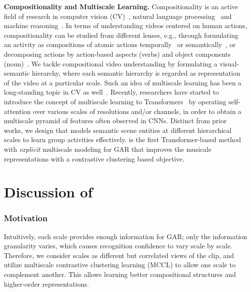 \documentclass[runningheads]{llncs}
\begin{document}
 
\noindent \textbf{Compositionality
and Multiscale Learning.}
Compositionality is an active field of research 
in computer vision (CV)~\cite{zhan2020multi,kim2020safcar,yan2020interactive,sun2021counterfactual}, 
natural language processing~\cite{socher2014grounded,vendrov2015order,irsoy2014deep,dankers2021paradox}
and machine reasoning~\cite{hudson2018compositional,hudson2019learning,bottou2014machine}.
In terms of understanding videos centered on human actions, compositionality can be studied from different lenses, e.g., through formulating an activity 
as compositions of atomic actions temporally~\cite{rai2021home,grunde2021agqa,chen2020rit,luo2021moma} or semantically~\cite{shao2020finegym,suris2021learning}, or decomposing actions by action-based aspects (verbs) and object components (noun)~\cite{ji2020action,jia2020lemma,materzynska2020something,le2021c,luo2021moma}.
We tackle compositional video understanding by formulating a visual-semantic hierarchy, where each 
semantic
hierarchy is regarded as representation of the video at 
a particular scale. Such an idea of multiscale learning has been a long-standing topic
in CV 
as well~\cite{li2020dynamic,li2016visual,gong2019cnn,haber2018learning}.
Recently, researchers 
have 
started to introduce the concept of multiscale learning to Transformers~\cite{fan2021multiscale,liu2021swin,han2021transformer} by operating self-attention over various scales of resolutions and/or channels, in order to obtain a multiscale pyramid of features often observed in CNNs.
Distinct from prior works, we design \ours
that models semantic scene entities at different hierarchical scales to learn group activities effectively.
\ours is the first Transformer-based method with \textit{explicit} multiscale modeling for GAR that improves the musicale representations
with a contrastive clustering based 
objective.



 \renewcommand{\thesection}{H}
\section{Discussion of \ours}
\label{appendix_sec:discussion}

\subsubsection{Motivation}
Intuitively, each scale provides enough information for GAR;
only the information granularity varies, which causes recognition confidence 
to vary scale by scale. 
Therefore, we consider
scales as different but correlated views of the clip, and 
utilize multiscale contrastive clustering learning (MCCL) to allow one scale
to complement another.
This allows learning better compositional structures and
higher-order representations.
\end{document}
